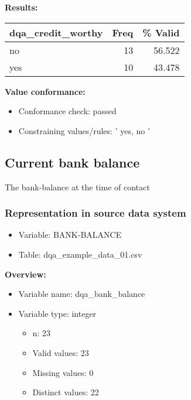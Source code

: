 \documentclass[
]{article}
\providecommand{\tightlist}{%
  \setlength{\itemsep}{0pt}\setlength{\parskip}{0pt}}
\begin{document}
\textbf{Results:}\\

\begin{table}[H]
\centering
\begin{tabular}{l|r|r}
\hline
\textbf{dqa\_credit\_worthy} & \textbf{Freq} & \textbf{\% Valid}\\
\hline
no & 13 & 56.522\\
\hline
yes & 10 & 43.478\\
\hline
\end{tabular}
\end{table}

\textbf{Value conformance:}

\begin{itemize}
\tightlist
\item
  Conformance check: passed
\item
  Constraining values/rules: ' yes, no '
\end{itemize}

\newpage

\hypertarget{current-bank-balance}{%
\subsection{Current bank balance}\label{current-bank-balance}}

The bank-balance at the time of contact

\hypertarget{representation-in-source-data-system-4}{%
\subsubsection{\texorpdfstring{Representation in \textbf{source} data
system}{Representation in source data system}}\label{representation-in-source-data-system-4}}

\begin{itemize}
\tightlist
\item
  Variable: BANK-BALANCE
\item
  Table: dqa\_example\_data\_01.csv
\end{itemize}

\textbf{Overview:}

\begin{itemize}
\tightlist
\item
  Variable name: dqa\_bank\_balance
\item
  Variable type: integer

  \begin{itemize}
  \tightlist
  \item
    n: 23
  \item
    Valid values: 23
  \item
    Missing values: 0
  \item
    Distinct values: 22
  \end{itemize}
\end{itemize}
\end{document}
